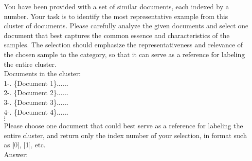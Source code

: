 \documentclass{article}
\begin{document}
\begin{tcolorbox}[colback=white, title = \textbf{Table C.5}: Prompt to Choose Representative Landmarks for Each Cluster ,colframe=black, sharp corners]
  You have been provided with a set of similar documents, each indexed by a number. Your task is to identify the most representative example from this cluster of documents. Please carefully analyze the given documents and select one document that best captures the common essence and characteristics of the samples. The selection should emphasize the representativeness and relevance of the chosen sample to the category, so that it can serve as a reference for labeling the entire cluster.\\
  
  Documents in the cluster:\\
  
  1-. \{Document 1\}...... \\
  
  2-. \{Document 2\}......\\
    
  3-. \{Document 3\}......\\
    
  4-. \{Document 4\}......\\
   
   $\vdots$\\
   
  Please choose one document that could best serve as a reference for labeling the entire cluster, and return only the index number of your selection, in format such as [0], [1], etc.\\
  
  Answer:\\
\end{tcolorbox}
\end{document}
